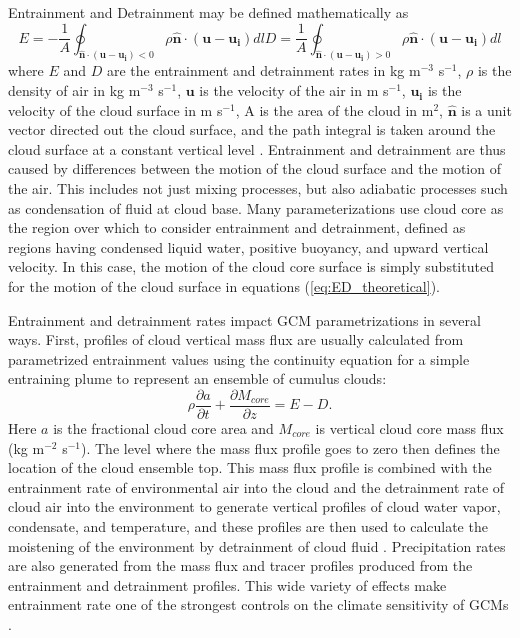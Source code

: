 \documentclass[12pt]{article}
\begin{document}
Entrainment and Detrainment may be defined mathematically as
\begin{subequations}
 \label{eq:ED_theoretical}
\begin{equation}
E = -\frac{1}{A}\oint_{\mathbf{\hat{n}}\cdot(\mathbf{u} - \mathbf{u_i}) < 0}
\rho\mathbf{\hat{n}}\cdot(\mathbf{u}-\mathbf{u_i})dl
\end{equation}
\begin{equation}
D = \frac{1}{A}\oint_{\mathbf{\hat{n}}\cdot(\mathbf{u} - \mathbf{u_i}) > 0}
\rho\mathbf{\hat{n}}\cdot(\mathbf{u}-\mathbf{u_i})dl
\end{equation}
\end{subequations}
where $E$ and $D$ are the entrainment and detrainment rates in kg m$^{-3}$ 
s$^{-1}$, $\rho$ is the density of air in kg m$^{-3}$ s$^{-1}$, $\mathbf{u}$ is 
the velocity of the air in m s$^{-1}$, $\mathbf{u_i}$ is the velocity of the 
cloud surface in m s$^{-1}$, A is the area of the cloud in m$^2$, 
$\mathbf{\hat{n}}$ is a unit vector directed out the cloud surface, and the 
path integral is taken around the cloud surface at a constant vertical level 
\citep{Siebesma1998}.  Entrainment and detrainment are thus caused by 
differences between the motion of the cloud surface and the motion of the air.  
This includes not just mixing processes, but also adiabatic processes such as 
condensation of fluid at cloud base.  Many parameterizations use cloud core as 
the region over which to consider entrainment and detrainment, defined as
regions having condensed liquid water, positive buoyancy, and upward vertical
velocity.  In this case, the motion of the cloud core surface is simply 
substituted for the motion of the cloud surface in equations 
(\ref{eq:ED_theoretical}).

Entrainment and detrainment rates impact GCM parametrizations in several ways.
First, profiles of cloud vertical mass flux are usually calculated from 
parametrized entrainment values using the continuity equation for a 
simple entraining plume to represent an ensemble of cumulus clouds:
\begin{equation}
   \label{eq:continuity}
   \rho \frac{\partial a}{\partial t} 
   + \frac{\partial M_{core}}{\partial z} = E - D.
\end{equation}
Here $a$ is the fractional cloud core area  and $M_{core}$ is vertical cloud 
core mass flux (kg m$^{-2}$ s$^{-1}$). The level where the mass flux profile 
goes to zero then defines the location of the cloud ensemble top.  This mass 
flux profile is combined with the entrainment rate of environmental air into 
the cloud and the detrainment rate of cloud air into the environment to 
generate vertical profiles of cloud water vapor, condensate, and 
temperature, and these profiles are then used to calculate the moistening 
of the environment by detrainment of cloud fluid 
\citep{Tiedtke1989, Kain1990}.  Precipitation rates are also generated from the
mass flux and tracer profiles produced from the entrainment and detrainment
profiles.  This wide variety of effects make entrainment rate one of the 
strongest controls on the climate sensitivity of GCMs 
\citep{Stainforth2005, Rougier2009}.
\end{document}
